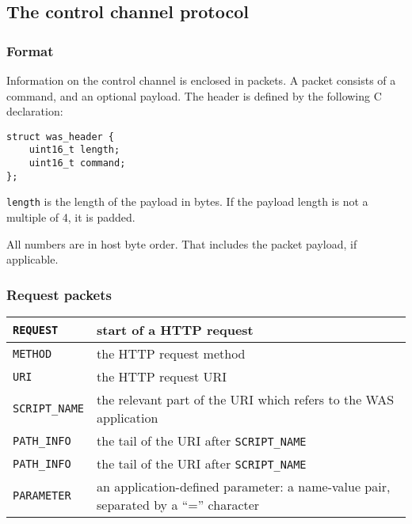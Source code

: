 \documentclass[a4paper,12pt]{article}
\begin{document}
\subsection{The control channel protocol}

\subsubsection{Format}

Information on the control channel is enclosed in packets.  A packet
consists of a command, and an optional payload.  The header is defined
by the following C declaration:

\begin{verbatim}
struct was_header {
    uint16_t length;
    uint16_t command;
};
\end{verbatim}

\texttt{length} is the length of the payload in bytes.  If the payload
length is not a multiple of 4, it is padded.

All numbers are in host byte order.  That includes the packet payload,
if applicable.

\subsubsection{Request packets}

\begin{longtable}{|l|p{10cm}|}
\hline

\texttt{REQUEST} & start of a HTTP request \\

\hline

\texttt{METHOD} & the HTTP request method \\

\hline

\texttt{URI} & the HTTP request URI \\

\hline

\texttt{SCRIPT\_NAME} & the relevant part of the URI which refers to
the WAS application \\

\hline

\texttt{PATH\_INFO} & the tail of the URI after \texttt{SCRIPT\_NAME} \\

\hline

\texttt{PATH\_INFO} & the tail of the URI after \texttt{SCRIPT\_NAME} \\

\hline

\texttt{PARAMETER} & an application-defined parameter: a name-value
pair, separated by a ``='' character \\

\hline
\end{longtable}
\end{document}
